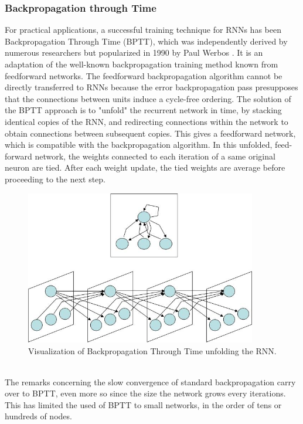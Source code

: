 \documentclass[12pt,oneside]{CUNY_CS_PhD}
\begin{document}
\subsubsection{Backpropagation through Time}
For practical applications, a successful training technique for RNNs has been Backpropagation Through Time (BPTT), which was independently derived by numerous researchers but popularized in 1990 by Paul Werbos \cite{werbos_backpropagation_1990}. It is an adaptation of the well-known backpropagation training method known from feedforward networks. The feedforward backpropagation algorithm cannot be directly transferred to RNNs because the error backpropagation pass presupposes that the connections between units induce a cycle-free ordering. The solution of the BPTT approach is to "unfold" the recurrent network in time, by stacking identical copies of the RNN, and redirecting connections within the network to obtain connections between subsequent copies. This gives a feedforward network, which is compatible with the backpropagation algorithm. In this unfolded, feed-forward network, the weights connected to each iteration of a same original neuron are tied. After each weight update, the tied weights are average before proceeding to the next step.
\begin{figure}[h]
\centering
\includegraphics[width=0.9\textwidth]{pictures/bptt-influence.png}
\caption{Visualization of Backpropagation Through Time unfolding the RNN.}
\label{fig:bptt}
\end{figure}\\
The remarks concerning the slow convergence of standard backpropagation carry over to BPTT, even more so since the size the network grows every iterations. This has limited the used of BPTT to small networks, in the order of tens or hundreds of nodes.
\end{document}
